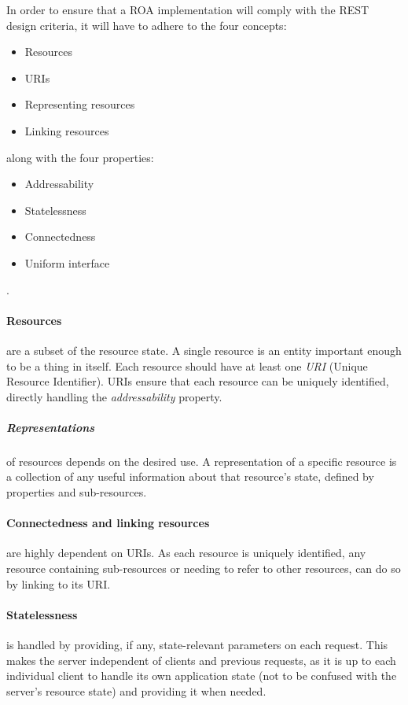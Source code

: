 In order to ensure that a ROA implementation will comply with the REST design criteria, it will have to adhere to the four concepts\cite[Chapter 4]{restful_web_services}:
\begin{itemize}
\item Resources
\item URIs
\item Representing resources
\item Linking resources
\end{itemize}
along with the four properties:
\begin{itemize}
\item Addressability
\item Statelessness
\item Connectedness
\item Uniform interface
\end{itemize}.

\paragraph{Resources} are a subset of the resource state.
A single resource is an entity important enough to be a thing in itself.
Each resource should have at least one \textit{URI} (Unique Resource Identifier).
URIs ensure that each resource can be uniquely identified, directly handling the \textit{addressability} property.

\subparagraph{Representations} of resources depends on the desired use.
A representation of a specific resource is a collection of any useful information about that resource's state, defined by properties and sub-resources.

\paragraph{Connectedness and linking resources} are highly dependent on URIs.
As each resource is uniquely identified, any resource containing sub-resources or needing to refer to other resources, can do so by linking to its URI.

\paragraph{Statelessness} is handled by providing, if any, state-relevant parameters on each request.
This makes the server independent of clients and previous requests, as it is up to each individual client to handle its own application state (not to be confused with the server's resource state) and providing it when needed.

